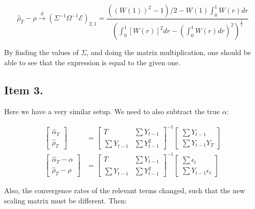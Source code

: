 \documentclass[12pt]{article}
\begin{document}
$$
\hat{\rho}_T - \rho \xrightarrow{d} \left(\Sigma^{-1}\Omega^{-1}\mathcal{E}\right)_{2,1} = \frac{((W(1))^2 - 1)/2 - W(1)\int^1_0W(r) dr}{\left(\int^1_0 [W(r)]^2 dr - (\int^1_0 W(r) dr)^2\right)^\frac{1}{2}}
$$

By finding the values of $\Sigma$, and doing the matrix multiplication, one should be able to see that the expression is equal to the given one.



\subsection*{Item 3.}

Here we have a very similar setup. We need to also subtract the true $\alpha$:

\begin{align*}
    \begin{bmatrix}
        \hat{\alpha}_T\\ \hat{\rho}_T
    \end{bmatrix} &=
    \begin{bmatrix}
        T & \sum Y_{t-1}\\ \sum Y_{t-1} & \sum Y^2_{t-1}
    \end{bmatrix}^{-1}
    \begin{bmatrix}
        \sum Y_{t-1} \\ \sum Y_{t-1}Y_T
    \end{bmatrix}\\
    \begin{bmatrix}
        \hat{\alpha}_T - \alpha\\ \hat{\rho}_T - \rho
    \end{bmatrix} &= \begin{bmatrix}
        T & \sum Y_{t-1}\\ \sum Y_{t-1} & \sum Y^2_{t-1}
    \end{bmatrix}^{-1}
    \begin{bmatrix}
        \sum \epsilon_t \\ \sum Y_{t-1}\epsilon_t
    \end{bmatrix}
\end{align*}

Also, the convergence rates of the relevant terms changed, such that the new scaling matrix must be different. Then:
\end{document}
